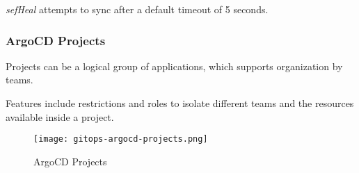\emph{sefHeal} attempts to sync after a default timeout of 5 seconds. 

\subsubsection{ArgoCD Projects}
Projects can be a logical group of applications, which supports organization by teams.

Features include restrictions and roles to isolate different teams and the resources available inside a project.

\begin{figure}[h]
    \centering
    \texttt{[image: gitops-argocd-projects.png]}
    \caption{ArgoCD Projects}
\end{figure}
